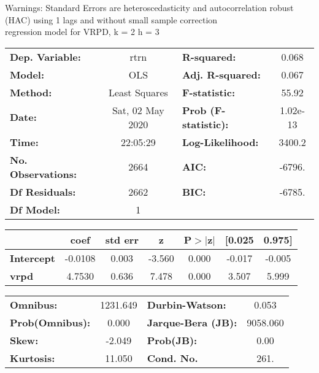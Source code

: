 Warnings: \newline
 [1] Standard Errors are heteroscedasticity and autocorrelation robust (HAC) using 1 lags and without small sample correction\\ 

regression model for VRPD, k = 2 h = 3\begin{center}
\begin{tabular}{lclc}
\toprule
\textbf{Dep. Variable:}    &       rtrn       & \textbf{  R-squared:         } &     0.068   \\
\textbf{Model:}            &       OLS        & \textbf{  Adj. R-squared:    } &     0.067   \\
\textbf{Method:}           &  Least Squares   & \textbf{  F-statistic:       } &     55.92   \\
\textbf{Date:}             & Sat, 02 May 2020 & \textbf{  Prob (F-statistic):} &  1.02e-13   \\
\textbf{Time:}             &     22:05:29     & \textbf{  Log-Likelihood:    } &    3400.2   \\
\textbf{No. Observations:} &        2664      & \textbf{  AIC:               } &    -6796.   \\
\textbf{Df Residuals:}     &        2662      & \textbf{  BIC:               } &    -6785.   \\
\textbf{Df Model:}         &           1      & \textbf{                     } &             \\
\bottomrule
\end{tabular}
\begin{tabular}{lcccccc}
                   & \textbf{coef} & \textbf{std err} & \textbf{z} & \textbf{P$> |$z$|$} & \textbf{[0.025} & \textbf{0.975]}  \\
\midrule
\textbf{Intercept} &      -0.0108  &        0.003     &    -3.560  &         0.000        &       -0.017    &       -0.005     \\
\textbf{vrpd}      &       4.7530  &        0.636     &     7.478  &         0.000        &        3.507    &        5.999     \\
\bottomrule
\end{tabular}
\begin{tabular}{lclc}
\textbf{Omnibus:}       & 1231.649 & \textbf{  Durbin-Watson:     } &    0.053  \\
\textbf{Prob(Omnibus):} &   0.000  & \textbf{  Jarque-Bera (JB):  } & 9058.060  \\
\textbf{Skew:}          &  -2.049  & \textbf{  Prob(JB):          } &     0.00  \\
\textbf{Kurtosis:}      &  11.050  & \textbf{  Cond. No.          } &     261.  \\
\bottomrule
\end{tabular}
\end{center}

